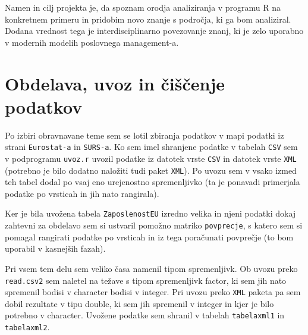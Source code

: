 \documentclass[11pt,a4paper]{article}
\begin{document}
Namen in cilj projekta je, da spoznam orodja analiziranja v programu R na konkretnem primeru in pridobim novo znanje s področja, ki ga bom analiziral. Dodana vrednost tega je interdisciplinarno povezovanje znanj, ki je zelo uporabno v modernih modelih poslovnega management-a. 
\pagebreak
\section{Obdelava, uvoz in čiščenje podatkov}

Po izbiri obravnavane teme sem se lotil zbiranja podatkov v mapi podatki iz strani \verb|Eurostat-a| in \verb|SURS-a|. Ko sem imel shranjene podatke v tabelah \verb|CSV| sem v podprogramu \verb|uvoz.r| uvozil podatke iz datotek vrste \verb|CSV| in datotek vrste \verb|XML| (potrebno je bilo dodatno naložiti tudi paket \verb|XML|). Po uvozu sem v vsako izmed teh tabel dodal po vsaj eno urejenostno spremenljivko (ta je ponavadi primerjala podatke po vrsticah in jih nato rangirala). 

Ker je bila uvožena tabela \verb|ZaposlenostEU| izredno velika in njeni podatki dokaj zahtevni za obdelavo sem si ustvaril pomožno matriko \verb|povprecje|, s katero sem si pomagal rangirati podatke po vrsticah in iz tega poračunati povprečje (to bom uporabil v kasnejših fazah). 

Pri vsem tem delu sem veliko časa namenil tipom spremenljivk. Ob uvozu preko \verb|read.csv2| sem naletel na težave s tipom spremenljivk factor, ki sem jih nato spremenil bodisi v character bodisi v integer. Pri uvozu preko \verb|XML| paketa pa sem dobil rezultate v tipu double, ki sem jih spremenil v integer in kjer je bilo potrebno v character. Uvožene podatke sem shranil v tabelah \verb|tabelaxml1| in \verb|tabelaxml2|. 
\end{document}
